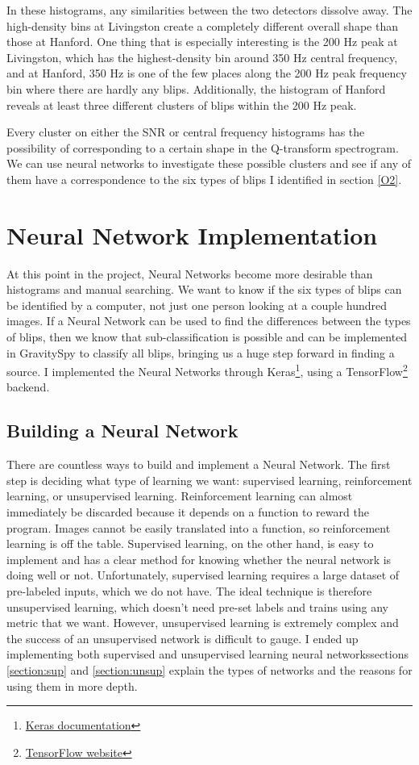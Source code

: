 \documentclass[a4paper]{article}
\begin{document}
In these histograms, any similarities between the two detectors dissolve away. The high-density bins at Livingston create a completely different overall shape than those at Hanford. One thing that is especially interesting is the 200 Hz peak at Livingston, which has the highest-density bin around 350 Hz central frequency, and at Hanford, 350 Hz is one of the few places along the 200 Hz peak frequency bin where there are hardly any blips. Additionally, the histogram of Hanford reveals at least three different clusters of blips within the 200 Hz peak. 

Every cluster on either the SNR or central frequency histograms has the possibility of corresponding to a certain shape in the Q-transform spectrogram. We can use neural networks to investigate these possible clusters and see if any of them have a correspondence to the six types of blips I identified in section \ref{O2}. 

\section{Neural Network Implementation}

At this point in the project, Neural Networks become more desirable than histograms and manual searching. We want to know if the six types of blips can be identified by a computer, not just one person looking at a couple hundred images. If a Neural Network can be used to find the differences between the types of blips, then we know that sub-classification is possible and can be implemented in GravitySpy to classify all blips, bringing us a huge step forward in finding a source. I implemented the Neural Networks through Keras\footnote{\href{https://keras.io}{Keras documentation}}, using a TensorFlow\footnote{\href{https://www.tensorflow.org}{TensorFlow website}} backend.

\subsection{Building a Neural Network} \label{section:build_nn}

There are countless ways to build and implement a Neural Network. The first step is deciding what type of learning we want: supervised learning, reinforcement learning, or unsupervised learning. Reinforcement learning can almost immediately be discarded because it depends on a function to reward the program. Images cannot be easily translated into a function, so reinforcement learning is off the table. Supervised learning, on the other hand, is easy to implement and has a clear method for knowing whether the neural network is doing well or not. Unfortunately, supervised learning requires a large dataset of pre-labeled inputs, which we do not have. The ideal technique is therefore unsupervised learning, which doesn't need pre-set labels and trains using any metric that we want. However, unsupervised learning is extremely complex and the success of an unsupervised network is difficult to gauge. I ended up implementing both supervised and unsupervised learning neural networks\textemdash sections \ref{section:sup} and \ref{section:unsup} explain the types of networks and the reasons for using them in more depth.
\end{document}
